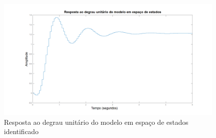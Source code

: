 \begin{figure}[H]
	\centering
	\includegraphics[width=1\linewidth]{respostadegrausub}
	\caption[Resposta ao degrau do modelo em espaço de estados]{Resposta ao degrau unitário do modelo em espaço de estados identificado}
	\label{fig:respostadegrausub}
\end{figure}



